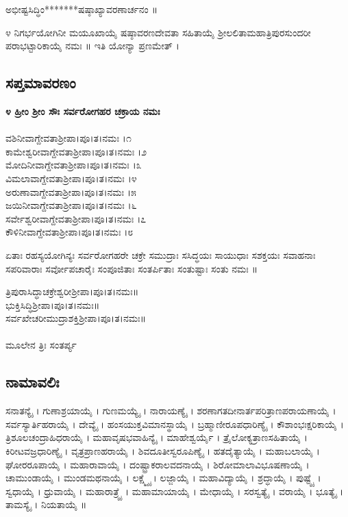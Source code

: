  ಅಭೀಷ್ಟಸಿದ್ಧಿಂ*******ಷಷ್ಠಾಖ್ಯಾವರಣಾರ್ಚನಂ ॥

೪ ನಿಗರ್ಭಯೋಗಿನೀ ಮಯೂಖಾಯೈ ಷಷ್ಠಾವರಣದೇವತಾ ಸಹಿತಾಯೈ ಶ್ರೀಲಲಿತಾಮಹಾತ್ರಿಪುರಸುಂದರೀ ಪರಾಭಟ್ಟಾರಿಕಾಯೈ ನಮಃ ॥ ಇತಿ ಯೋನ್ಯಾ ಪ್ರಣಮೇತ್ ।
\subsection{ಸಪ್ತಮಾವರಣಂ}
{\bfseries ೪ ಹ್ರೀಂ ಶ್ರೀಂ ಸೌಃ ಸರ್ವರೋಗಹರ ಚಕ್ರಾಯ ನಮಃ}\\
\\ ವಶಿನೀವಾಗ್ದೇವತಾಶ್ರೀಪಾ।ಪೂ।ತ।ನಮಃ ।೧\\
 ಕಾಮೇಶ್ವರೀವಾಗ್ದೇವತಾಶ್ರೀಪಾ।ಪೂ।ತ।ನಮಃ ।೨\\
 ಮೋದಿನೀವಾಗ್ದೇವತಾಶ್ರೀಪಾ।ಪೂ।ತ।ನಮಃ ।೩\\
 ವಿಮಲಾವಾಗ್ದೇವತಾಶ್ರೀಪಾ।ಪೂ।ತ।ನಮಃ ।೪\\
 ಅರುಣಾವಾಗ್ದೇವತಾಶ್ರೀಪಾ।ಪೂ।ತ।ನಮಃ ।೫\\
 ಜಯಿನೀವಾಗ್ದೇವತಾಶ್ರೀಪಾ।ಪೂ।ತ।ನಮಃ ।೬\\
 ಸರ್ವೇಶ್ವರೀವಾಗ್ದೇವತಾಶ್ರೀಪಾ।ಪೂ।ತ।ನಮಃ ।೭\\
 ಕೌಳಿನೀವಾಗ್ದೇವತಾಶ್ರೀಪಾ।ಪೂ।ತ।ನಮಃ ।೮

 ಏತಾಃ ರಹಸ್ಯಯೋಗಿನ್ಯಃ ಸರ್ವರೋಗಹರೇ ಚಕ್ರೇ ಸಮುದ್ರಾಃ ಸಸಿದ್ಧಯಃ ಸಾಯುಧಾಃ ಸಶಕ್ತಯಃ ಸವಾಹನಾಃ ಸಪರಿವಾರಾಃ ಸರ್ವೋಪಚಾರೈಃ ಸಂಪೂಜಿತಾಃ ಸಂತರ್ಪಿತಾಃ ಸಂತುಷ್ಟಾಃ ಸಂತು ನಮಃ ॥

 ತ್ರಿಪುರಾಸಿದ್ಧಾಚಕ್ರೇಶ್ವರೀಶ್ರೀಪಾ।ಪೂ।ತ।ನಮಃ॥\\
 ಭುಕ್ತಿಸಿದ್ಧಿಶ್ರೀಪಾ।ಪೂ।ತ।ನಮಃ॥\\
 ಸರ್ವಖೇಚರೀಮುದ್ರಾಶಕ್ತಿಶ್ರೀಪಾ।ಪೂ।ತ।ನಮಃ॥\\
\\
ಮೂಲೇನ ತ್ರಿಃ ಸಂತರ್ಪ್ಯ
\subsection{ನಾಮಾವಲಿಃ}
ಸನಾತನ್ಯೈ । ಗುಣಾಶ್ರಯಾಯೈ । ಗುಣಮಯ್ಯೈ । ನಾರಾಯಣ್ಯೈ । ಶರಣಾಗತದೀನಾರ್ತಪರಿತ್ರಾಣಪರಾಯಣಾಯೈ । ಸರ್ವಸ್ಯಾರ್ತಿಹರಾಯೈ । ದೇವ್ಯೈ । ಹಂಸಯುಕ್ತವಿಮಾನಸ್ಥಾಯೈ । ಬ್ರಹ್ಮಾಣೀರೂಪಧಾರಿಣ್ಯೈ । ಕೌಶಾಂಭಃಕ್ಷರಿಕಾಯೈ । ತ್ರಿಶೂಲಚಂದ್ರಾಹಿಧರಾಯೈ । ಮಹಾವೃಷಭವಾಹಿನ್ಯೈ । ಮಾಹೇಶ್ವರ್ಯೈ । ತ್ರೈಲೋಕ್ಯತ್ರಾಣಸಹಿತಾಯೈ । ಕಿರೀಟವಜ್ರಧಾರಿಣ್ಯೈ । ವೃತ್ರಪ್ರಾಣಹರಾಯೈ । ಶಿವದೂತೀಸ್ವರೂಪಿಣ್ಯೈ । ಹತದೈತ್ಯಾಯೈ । ಮಹಾಬಲಾಯೈ । ಘೋರರೂಪಾಯೈ । ಮಹಾರಾವಾಯೈ । ದಂಷ್ಟ್ರಾಕರಾಲವದನಾಯೈ । ಶಿರೋಮಾಲಾವಿಭೂಷಣಾಯೈ । ಚಾಮುಂಡಾಯೈ । ಮುಂಡಮಥನಾಯೈ । ಲಕ್ಷ್ಮ್ಯೈ । ಲಜ್ಜಾಯೈ । ಮಹಾವಿದ್ಯಾಯೈ । ಶ್ರದ್ಧಾಯೈ । ಪುಷ್ಟ್ಯೈ । ಸ್ವಧಾಯೈ । ಧ್ರುವಾಯೈ । ಮಹಾರಾತ್ರ್ಯೈ । ಮಹಾಮಾಯಾಯೈ । ಮೇಧಾಯೈ । ಸರಸ್ವತ್ಯೈ । ವರಾಯೈ । ಭೂತ್ಯೈ । ತಾಮಸ್ಯೈ । ನಿಯತಾಯೈ ॥\\

